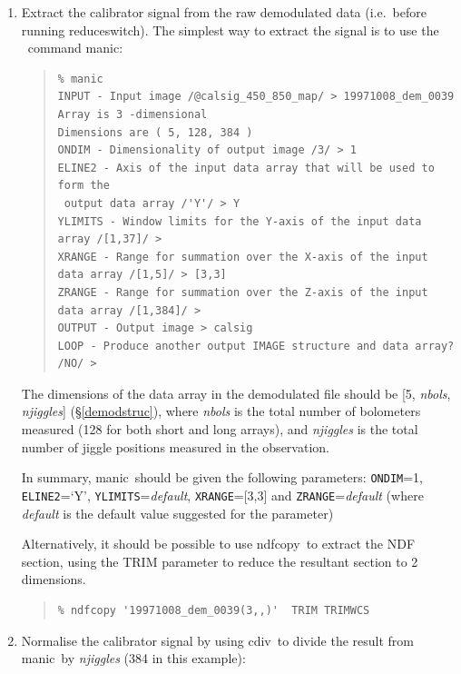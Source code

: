 \documentclass[twoside,11pt]{article}
\newcommand{\Kappa}{\xref{{\sc{Kappa}}}{sun95}{}}
\newcommand{\task}[1]{{\sf #1}}
\newcommand{\param}[1]{{\tt #1}}
\newcommand{\resw}{\htmlref{\task{reduce\_switch}}{REDUCE_SWITCH}}
\newcommand{\ndfcopy}{\xref{\task{ndfcopy}}{sun95}{NDFCOPY}}
\newcommand{\manic}{\xref{\task{manic}}{sun95}{MANIC}}
\newcommand{\cdiv}{\xref{\task{cdiv}}{sun95}{CDIV}}
\newenvironment{myquote}{\begin{quote}\begin{small}}{\end{small}\end{quote}}
\newcommand{\htmlref}[2]{#1}
\newcommand{\xref}[3]{#1}
\renewcommand{\_}{\texttt{\symbol{95}}}
\begin{document}
\begin{enumerate}

\item Extract the calibrator signal from the raw demodulated data (i.e.\
before running \resw). The simplest way to extract the signal is to use
the \Kappa\ command \manic:

\begin{myquote}
\begin{verbatim}
% manic
INPUT - Input image /@calsig_450_850_map/ > 19971008_dem_0039
Array is 3 -dimensional
Dimensions are ( 5, 128, 384 )
ONDIM - Dimensionality of output image /3/ > 1
ELINE2 - Axis of the input data array that will be used to form the 
 output data array /'Y'/ > Y
YLIMITS - Window limits for the Y-axis of the input data array /[1,37]/ > 
XRANGE - Range for summation over the X-axis of the input data array /[1,5]/ > [3,3]
ZRANGE - Range for summation over the Z-axis of the input data array /[1,384]/ > 
OUTPUT - Output image > calsig
LOOP - Produce another output IMAGE structure and data array? /NO/ > 
\end{verbatim}
\end{myquote}

The dimensions of the data array in the demodulated file should be [5,
\textit{n\_bols}, \textit{n\_jiggles}] (\S\ref{demodstruc}), where
\textit{n\_bols} is the total number of bolometers measured (128 for both
short and long arrays), and \textit{n\_jiggles} is the total number of jiggle
positions measured in the observation.

In summary, \manic\ should be given the following parameters: \param{ONDIM}=1,
\param{ELINE2}=`Y', \param{YLIMITS}=\textit{default}, \param{XRANGE}=[3,3] and
\param{ZRANGE}=\textit{default} 
(where \textit{default} is the default value suggested for the parameter)

Alternatively, it should be possible to use \ndfcopy\ to extract the
NDF section, using the TRIM parameter to reduce the resultant section
to 2 dimensions.

\begin{myquote}
\begin{verbatim}
% ndfcopy '19971008_dem_0039(3,,)'  TRIM TRIMWCS
\end{verbatim}
\end{myquote}


\item Normalise the calibrator signal by using \cdiv\ to divide the result
from \manic\ by \textit{n\_jiggles} (384 in this example):


\end{enumerate}
\end{document}
